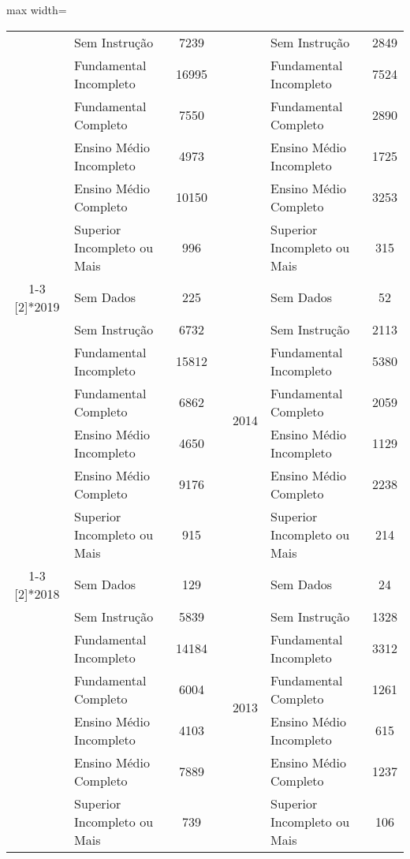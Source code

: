 \documentclass[14pt]{extarticle}
\begin{document}
\begin{table}[htbp]
\begin{adjustbox}{max width=\linewidth}
\begin{tabular}{clccclc}
         & Sem Instrução & 7239 &      &      & Sem Instrução & 2849 \\
         & Fundamental Incompleto & 16995 &      &      & Fundamental Incompleto & 7524 \\
         & Fundamental Completo & 7550 &      &      & Fundamental Completo & 2890 \\
         & Ensino Médio Incompleto & 4973 &      &      & Ensino Médio Incompleto & 1725 \\
         & Ensino Médio Completo & 10150 &      &      & Ensino Médio Completo & 3253 \\
         & Superior Incompleto ou Mais & 996  &      &      & Superior Incompleto ou Mais & 315 \\
\cmidrule{1-3}\cmidrule{5-7}    \multirow{7}[2]{*}{2019} & Sem Dados & 225  &      & \multirow{7}[2]{*}{2014} & Sem Dados & 52 \\
         & Sem Instrução & 6732 &      &      & Sem Instrução & 2113 \\
         & Fundamental Incompleto & 15812 &      &      & Fundamental Incompleto & 5380 \\
         & Fundamental Completo & 6862 &      &      & Fundamental Completo & 2059 \\
         & Ensino Médio Incompleto & 4650 &      &      & Ensino Médio Incompleto & 1129 \\
         & Ensino Médio Completo & 9176 &      &      & Ensino Médio Completo & 2238 \\
         & Superior Incompleto ou Mais & 915  &      &      & Superior Incompleto ou Mais & 214 \\
\cmidrule{1-3}\cmidrule{5-7}    \multirow{7}[2]{*}{2018} & Sem Dados & 129  &      & \multirow{7}[2]{*}{2013} & Sem Dados & 24 \\
         & Sem Instrução & 5839 &      &      & Sem Instrução & 1328 \\
         & Fundamental Incompleto & 14184 &      &      & Fundamental Incompleto & 3312 \\
         & Fundamental Completo & 6004 &      &      & Fundamental Completo & 1261 \\
         & Ensino Médio Incompleto & 4103 &      &      & Ensino Médio Incompleto & 615 \\
         & Ensino Médio Completo & 7889 &      &      & Ensino Médio Completo & 1237 \\
         & Superior Incompleto ou Mais & 739  &      &      & Superior Incompleto ou Mais & 106 \\

\end{tabular}
\end{adjustbox}
\end{table}
\end{document}
